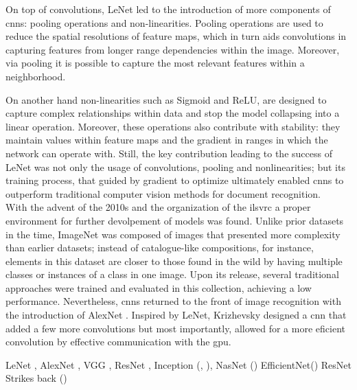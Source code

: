 \noindent On top of convolutions, LeNet led to the introduction of more components of \glspl{cnn}: 
pooling operations and non-linearities. Pooling operations are used to reduce the spatial 
resolutions of feature maps, which in turn aids convolutions in capturing features from longer 
range dependencies within the image. Moreover, via pooling it is possible to capture the most 
relevant features within a neighborhood.

On another hand non-linearities such as Sigmoid and ReLU, are designed to capture complex 
relationships within data and stop the model collapsing into a linear operation. Moreover, these 
operations also contribute with stability: they maintain values within feature maps and the gradient 
in ranges in which the network can operate with. %
Still, the key contribution leading to the success of LeNet was not only the usage of 
convolutions, pooling and nonlinearities; but its training process, that guided by gradient to 
optimize ultimately enabled \glspl{cnn} to outperform traditional computer vision methods for document 
recognition. \\

\noindent With the advent of the 2010s and the organization of the \gls{ilsvrc} \autocite{ILSVRC15} 
a proper environment for further devolpement of models was found. Unlike prior datasets in the 
time, ImageNet was composed of images that presented more complexity than earlier datasets; instead 
of catalogue-like compositions, for instance, elements in this dataset are closer to those found in 
the wild by having multiple classes or instances of a class in one  image. Upon its release, 
several traditional approaches were trained and evaluated in this collection, achieving a low 
performance. Nevertheless, \glspl{cnn} returned to the front of image recognition with the 
introduction of AlexNet \autocite{krizhevsky2012imagenet}. Inspired by LeNet, Krizhevsky designed a 
\gls{cnn} that added a few more convolutions but most importantly, allowed for a more eficient 
convolution by effective communication with the \gls{gpu}.



 LeNet \cite{lecun1998gradient}, AlexNet \cite{krizhevsky2012imagenet}, VGG \cite{simonyan2015deep}, ResNet \cite{he2016deep}, 
Inception (\cite{szegedy2015going}, \cite{szegedy2016rethinking}), NasNet (\cite{zoph2018learning})
EfficientNet(\cite{tan2019efficientnet}) 
ResNet Strikes back (\cite{wightman2021resnet}) \autocite{liu2022convnet}

